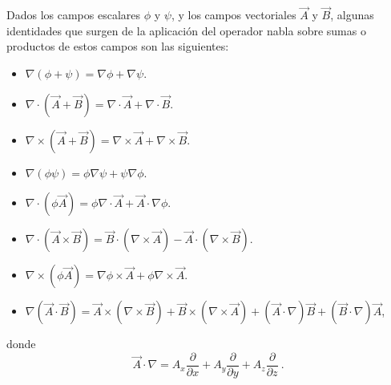 Dados los campos escalares $\phi$ y $\psi$, y los campos vectoriales $\vec{A}$ y $\vec{B}$, algunas identidades que surgen de la aplicación del operador nabla sobre sumas o productos de estos campos son las siguientes:
\begin{itemize}
    \item $\nabla (\phi + \psi) = \nabla \phi + \nabla \psi$.
    \item $\nabla \cdot \left( \vec{A} + \vec{B} \right) = \nabla \cdot \vec{A} + \nabla \cdot \vec{B}$.
    \item $\nabla \times \left( \vec{A} + \vec{B} \right) = \nabla \times \vec{A} + \nabla \times \vec{B}$.
    \item $\nabla(\phi \psi) = \phi \nabla \psi + \psi \nabla \phi$.
    \item $\nabla \cdot \left( \phi \vec{A} \right) = \phi \nabla \cdot \vec{A} + \vec{A} \cdot \nabla \phi$.
    \item $\nabla \cdot (\vec{A} \times \vec{B}) = \vec{B} \cdot (\nabla \times \vec{A}) - \vec{A} \cdot (\nabla \times \vec{B})$.
    \item $\nabla \times (\phi \vec{A}) = \nabla \phi \times \vec{A} + \phi \nabla \times \vec{A}$.
    \item $\nabla(\vec{A} \cdot \vec{B}) = \vec{A} \times (\nabla \times \vec{B}) + \vec{B} \times (\nabla \times \vec{A}) + (\vec{A} \cdot \nabla) \vec{B} + (\vec{B} \cdot \nabla) \vec{A}$,
\end{itemize}
donde 
\begin{equation*}
    \vec{A} \cdot \nabla = A_x \frac{\partial}{\partial x} + A_y \frac{\partial}{\partial y} + A_z \frac{\partial}{\partial z} \ .
\end{equation*}

